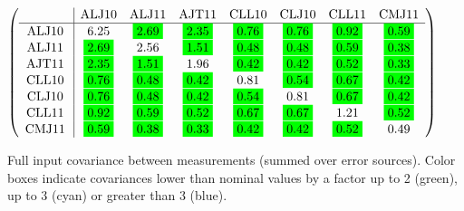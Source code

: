 \begin{table}[H]
\scriptsize
\begin{center}
\renewcommand{\arraystretch}{1.1}
\begin{math}\left(\begin{array}{c|ccccccc}
 & \mathrm{ALJ10} & 
\mathrm{ALJ11} & 
\mathrm{AJT11} & 
\mathrm{CLL10} & 
\mathrm{CLJ10} & 
\mathrm{CLL11} & 
\mathrm{CMJ11} \\
\hline
\mathrm{ALJ10} \hspace*{2pt} &       6.25 &  \colorbox{Green1}{$      2.69$} &  \colorbox{Green1}{$      2.35$} &  \colorbox{Green1}{$      0.76$} &  \colorbox{Green1}{$      0.76$} &  \colorbox{Green1}{$      0.92$} &  \colorbox{Green1}{$      0.59$} \\
\mathrm{ALJ11} \hspace*{2pt} &  \colorbox{Green1}{$      2.69$} &       2.56 &  \colorbox{Green1}{$      1.51$} &  \colorbox{Green1}{$      0.48$} &  \colorbox{Green1}{$      0.48$} &  \colorbox{Green1}{$      0.59$} &  \colorbox{Green1}{$      0.38$} \\
\mathrm{AJT11} \hspace*{2pt} &  \colorbox{Green1}{$      2.35$} &  \colorbox{Green1}{$      1.51$} &       1.96 &  \colorbox{Green1}{$      0.42$} &  \colorbox{Green1}{$      0.42$} &  \colorbox{Green1}{$      0.52$} &  \colorbox{Green1}{$      0.33$} \\
\mathrm{CLL10} \hspace*{2pt} &  \colorbox{Green1}{$      0.76$} &  \colorbox{Green1}{$      0.48$} &  \colorbox{Green1}{$      0.42$} &       0.81 &  \colorbox{Green1}{$      0.54$} &  \colorbox{Green1}{$      0.67$} &  \colorbox{Green1}{$      0.42$} \\
\mathrm{CLJ10} \hspace*{2pt} &  \colorbox{Green1}{$      0.76$} &  \colorbox{Green1}{$      0.48$} &  \colorbox{Green1}{$      0.42$} &  \colorbox{Green1}{$      0.54$} &       0.81 &  \colorbox{Green1}{$      0.67$} &  \colorbox{Green1}{$      0.42$} \\
\mathrm{CLL11} \hspace*{2pt} &  \colorbox{Green1}{$      0.92$} &  \colorbox{Green1}{$      0.59$} &  \colorbox{Green1}{$      0.52$} &  \colorbox{Green1}{$      0.67$} &  \colorbox{Green1}{$      0.67$} &       1.21 &  \colorbox{Green1}{$      0.52$} \\
\mathrm{CMJ11} \hspace*{2pt} &  \colorbox{Green1}{$      0.59$} &  \colorbox{Green1}{$      0.38$} &  \colorbox{Green1}{$      0.33$} &  \colorbox{Green1}{$      0.42$} &  \colorbox{Green1}{$      0.42$} &  \colorbox{Green1}{$      0.52$} &       0.49 \\
\end{array}\right)\end{math}
\caption{Full input covariance between measurements (summed over error sources). Color boxes indicate covariances lower than nominal values by a factor up to 2 (green), up to 3 (cyan) or greater than 3 (blue).}
\renewcommand{\arraystretch}{1}
\end{center}
\end{table}
